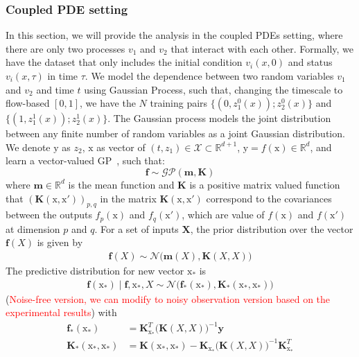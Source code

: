 \documentclass{article}
\begin{document}
\subsubsection{Coupled PDE setting}
\label{sec:Gaussian_coupled}
In this section, we will provide the analysis in the coupled PDEs setting, where there are only two processes $v_1$ and $v_2$ that interact with each other. Formally, we have the dataset that only includes the initial condition $v_i(x,0)$ and status $v_i(x, \tau)$ in time $\tau$. We model the dependence between two random variables $v_1$ and $v_2$ and time $t$ using Gaussian Process, such that, changing the timescale to flow-based $[0, 1]$, we have the $N$ training pairs $\{(0, z^0_1(x)); z^0_2(x)\}$ and $\{(1, z^1_1(x)); z^1_2(x)\}$. The Gaussian process \citep{Rasmussen2006Gaussian} models the joint distribution between any finite number of random variables as a joint Gaussian distribution. We denote $\mathrm{y}$ as $z_2$, $\mathrm{x}$ as vector of  $(t, z_1) \in \mathcal{X} \subset \mathbb{R}^{d+1}$, $\mathrm{y} = f(\mathrm{x}) \in \mathbb{R}^d$, and learn a vector-valued GP~\citep{alvarez2012kernelsvectorvaluedfunctionsreview}, such that:
\begin{equation}
   \mathbf{f} \sim \mathcal{GP}(\mathbf{m}, \mathbf{K})
\end{equation}
where $\mathbf{m} \in \mathbb{R}^d$ is the mean function and $\mathbf{K}$ is a
positive matrix valued function that $(\mathbf{K}(\mathrm{x},\mathrm{x}'))_{p,q}$ in the matrix $\mathbf{K}(\mathrm{x}, \mathrm{x}')$ correspond to
the covariances between the outputs $f_p(\mathrm{x})$ and $f_q(\mathrm{x}')$, which are value of $f(\mathrm{x})$ and $f(\mathrm{x}')$ at dimension $p$ and $q$. For a set of inputs $\mathbf{X}$, the prior distribution over the vector $\mathbf{f}(X)$ is given by 
\begin{align}
    \mathbf{f}(X) \sim \mathcal{N}\big(\mathbf{m}(X), \mathbf{K}(X,X) \big)
\end{align}
The predictive distribution for new vector $\mathrm{x}_{*}$ is 
\begin{align}
    \mathbf{f}(\mathrm{x}_{*}) \mid \mathbf{f}, \mathrm{x}_{*}, X \sim \mathcal{N} \big(\mathbf{f}_{*}(\mathrm{x}_{*}) , \mathbf{K}_{*}(\mathrm{x}_{*}, \mathrm{x}_{*})\big)
\end{align}
(\textcolor{red}{Noise-free version, we can modify to noisy observation version based on the experimental results}) with 
\begin{align}
    \mathbf{f}_{*}(\mathrm{x}_*) &= \mathbf{K}^{T}_{\mathrm{x}_{*}} \big(\mathbf{K}(X,X) )^{-1} \mathbf{y} \\ 
    \mathbf{K}_{*}(\mathrm{x}_{*}, \mathrm{x}_{*}) &= \mathbf{K}(\mathrm{x}_{*}, \mathrm{x}_{*}) - \mathbf{K}_{\mathrm{x}_{*}}\big(\mathbf{K}(X,X)\big)^{-1}\mathbf{K}^{T}_{\mathrm{x}_{*}}
\end{align}
\end{document}
